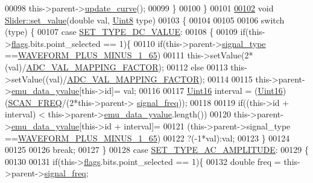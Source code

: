 \begin{DoxyCode}
00098     this->parent->\hyperlink{a00004_a15cbcf5f0a17281468800f47898f60c1}{update\_curve}();
00099     \}
00100 \}
00101 
\hypertarget{a00046_source_l00102}{}\hyperlink{a00024_ae3010d3de02715db2f443560d7d2a27b}{00102} \textcolor{keywordtype}{void} \hyperlink{a00024_ae3010d3de02715db2f443560d7d2a27b}{Slider::set\_value}(\textcolor{keywordtype}{double} val, \hyperlink{a00001_a979e3e23b9a449e69ab6a8a83b6042f8}{Uint8} type)
00103 \{
00104 
00105 
00106     \textcolor{keywordflow}{switch} (type) \{
00107     \textcolor{keywordflow}{case} \hyperlink{a00034_a347f6ec80828b93988d22989c0df015f}{SET\_TYPE\_DC\_VALUE}:
00108      \{
00109         \textcolor{keywordflow}{if}(this->\hyperlink{a00024_ade6449558d429b66e5ed1381bc9b9060}{flags}.bits.point\_selected == 1)\{
00110             \textcolor{keywordflow}{if}(this->parent->\hyperlink{a00004_a070edaec5aee6ba1f5a6866bc32c8ce4}{signal\_type} ==\hyperlink{a00034_a0923d3b365a36e1e8c401cec964aa36f}{WAVEFORM\_PLUS\_MINUS\_1\_65})
00111             this->setValue(2*(val)/\hyperlink{a00031_ada92d3eeeec0cbeee41e76a52d145792}{ADC\_VAL\_MAPPING\_FACTOR});
00112             \textcolor{keywordflow}{else}
00113             this->setValue((val)/\hyperlink{a00031_ada92d3eeeec0cbeee41e76a52d145792}{ADC\_VAL\_MAPPING\_FACTOR});
00114 
00115         this->parent->\hyperlink{a00004_ad922d05d1e988d84f404c115fe909f72}{emu\_data\_yvalue}[this->id]= val;
00116 
00117         \hyperlink{a00001_aae7407b021d43f7193a81a58cfb3e297}{Uint16} interval = (\hyperlink{a00001_aae7407b021d43f7193a81a58cfb3e297}{Uint16})(\hyperlink{a00031_a8127170b687c1f67a968886c128e76e4}{SCAN\_FREQ}/(2*this->parent->
      \hyperlink{a00004_a67039999d520fc483fab521fae5ddde4}{signal\_freq}));
00118 
00119         \textcolor{keywordflow}{if}((this->\textcolor{keywordtype}{id} + interval) < this->parent->\hyperlink{a00004_ad922d05d1e988d84f404c115fe909f72}{emu\_data\_yvalue}.length())
00120         this->parent->\hyperlink{a00004_ad922d05d1e988d84f404c115fe909f72}{emu\_data\_yvalue}[this->id + interval]=
00121         (this->parent->signal\_type ==\hyperlink{a00034_a0923d3b365a36e1e8c401cec964aa36f}{WAVEFORM\_PLUS\_MINUS\_1\_65})
00122         ?(-1*val):val;
00123         \}
00124 
00125 
00126         \textcolor{keywordflow}{break};
00127     \}
00128     \textcolor{keywordflow}{case} \hyperlink{a00034_a704f34d2cc6c149f96e9da9d2a1aa8c0}{SET\_TYPE\_AC\_AMPLITUDE}:
00129       \{
00130 
00131         \textcolor{keywordflow}{if}(this->\hyperlink{a00024_ade6449558d429b66e5ed1381bc9b9060}{flags}.bits.point\_selected == 1)\{
00132         \textcolor{keywordtype}{double} freq    = this->parent->\hyperlink{a00004_a67039999d520fc483fab521fae5ddde4}{signal\_freq};

\end{DoxyCode}
